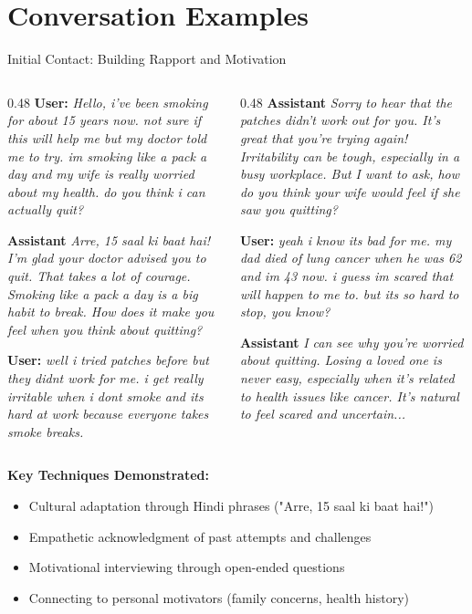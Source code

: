 \section{Conversation Examples}

\begin{frame}{Initial Contact: Building Rapport and Motivation}
  \begin{columns}
    \begin{column}{0.48\textwidth}
      \tiny
      \textbf{User:} \textit{Hello, i've been smoking for about 15 years now. not sure if this will help me but my doctor told me to try. im smoking like a pack a day and my wife is really worried about my health. do you think i can actually quit?}
      
      \vspace{0.2cm}
      \textbf{Assistant} \textit{Arre, 15 saal ki baat hai! I'm glad your doctor advised you to quit. That takes a lot of courage. Smoking like a pack a day is a big habit to break. How does it make you feel when you think about quitting?}
      
      \vspace{0.2cm}
      \textbf{User:} \textit{well i tried patches before but they didnt work for me. i get really irritable when i dont smoke and its hard at work because everyone takes smoke breaks.}
    \end{column}
    
    \begin{column}{0.48\textwidth}
      \tiny
      \textbf{Assistant} \textit{Sorry to hear that the patches didn't work out for you. It's great that you're trying again! Irritability can be tough, especially in a busy workplace. But I want to ask, how do you think your wife would feel if she saw you quitting?}
      
      \vspace{0.2cm}
      \textbf{User:} \textit{yeah i know its bad for me. my dad died of lung cancer when he was 62 and im 43 now. i guess im scared that will happen to me to. but its so hard to stop, you know?}
      
      \vspace{0.2cm}
      \textbf{Assistant} \textit{I can see why you're worried about quitting. Losing a loved one is never easy, especially when it's related to health issues like cancer. It's natural to feel scared and uncertain...}
    \end{column}
  \end{columns}
  
  \vspace{0.3cm}
  \footnotesize
  \textbf{Key Techniques Demonstrated:}
  \begin{itemize}
    \item Cultural adaptation through Hindi phrases ("Arre, 15 saal ki baat hai!")
    \item Empathetic acknowledgment of past attempts and challenges
    \item Motivational interviewing through open-ended questions
    \item Connecting to personal motivators (family concerns, health history)
  \end{itemize}
\end{frame}

